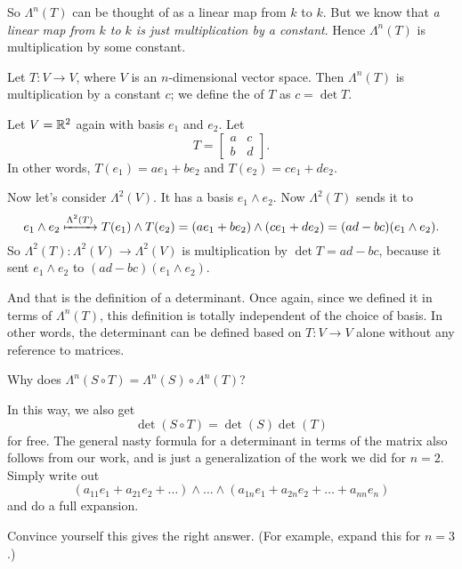 So $\Lambda^n(T)$ can be thought of as a linear map from $k$ to $k$.
But we know that \emph{a linear map from $k$ to $k$ is just multiplication by a constant}.
Hence $\Lambda^n(T)$ is multiplication by some constant.
\begin{definition}
	Let $T \colon V \to V$, where $V$ is an $n$-dimensional vector space.
	Then $\Lambda^n(T)$ is multiplication by a constant $c$;
	we define the  of $T$ as $c = \det T$.
\end{definition}

\begin{example}
	Let $V = \mathbb R^2$ again with basis $e_1$ and $e_2$.
	Let
	\[ T = \begin{bmatrix}
			a & c \\ b & d
		\end{bmatrix}.
	\]
	In other words, $T(e_1) = ae_1 + be_2$
	and $T(e_2) = ce_1 + de_2$.

	Now let's consider $\Lambda^2(V)$.
	It has a basis $e_1 \wedge e_2$.
	Now $\Lambda^2(T)$ sends it to
	\[ e_1 \wedge e_2 \xmapsto{\Lambda^2(T)}
		T(e_1) \wedge T(e_2) =
		(ae_1 + be_2) \wedge (ce_1 + de_2)
		= (ad-bc)(e_1 \wedge e_2).
	\]
	So $\Lambda^2(T) : \Lambda^2(V) \to \Lambda^2(V)$
	is multiplication by $\det T = ad-bc$,
	because it sent $e_1 \wedge e_2$ to
	$(ad-bc)(e_1 \wedge e_2)$.
\end{example}
And that is the definition of a determinant.
Once again, since we defined it in terms of $\Lambda^n(T)$,
this definition is totally independent of the choice of basis.
In other words, the determinant can be defined based on $T \colon V \to V$ alone
without any reference to matrices.

\begin{ques}
	Why does $\Lambda^n(S \circ T) = \Lambda^n(S) \circ \Lambda^n(T)$?
\end{ques}
In this way, we also get \[ \det(S \circ T) = \det(S) \det(T) \] for free.
The general nasty formula for a determinant
in terms of the matrix also follows from our work,
and is just a generalization of the work we did for $n=2$.
Simply write out
\[ \left( a_{11}e_1 + a_{21}e_2 + \dots \right) \wedge \dots \wedge
	\left( a_{1n}e_1 + a_{2n}e_2 + \dots + a_{nn} e_n \right)
\]
and do a full expansion.
\begin{exercise}
	Convince yourself this gives the right answer.
	(For example, expand this for $n=3$.)
\end{exercise}


